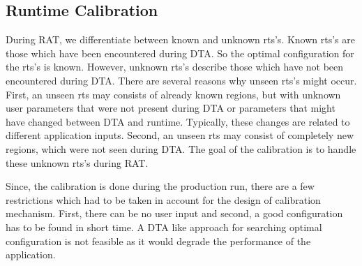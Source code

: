 \subsection{Runtime Calibration} \label{sec:calibration}
During RAT, we differentiate between known and unknown rts's. 
Known rts's are those which have been encountered during DTA. So the optimal configuration for the rts's is known. 
However, unknown rts's describe those which have not been encountered during DTA. 
There are several reasons why unseen rts's might occur. 
First, an unseen rts may consists of already known regions, but with unknown user parameters that were not present during DTA or parameters that might have changed between DTA and runtime. Typically, these changes are related to different application inputs. 
Second, an unseen rts may consist of completely new regions, which were not seen during DTA. 
The goal of the calibration is to handle these unknown rts's during RAT.

Since, the calibration is done during the production run, there are a few restrictions which had to be taken in account for the design of calibration mechanism. 
First, there can be no user input and 
second, a good configuration has to be found in short time. 
A DTA like approach for searching optimal configuration is not feasible as it would degrade the performance of the application.

